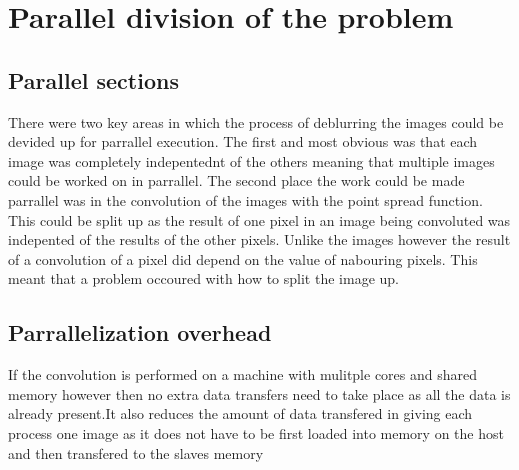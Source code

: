 \section{Parallel division of the problem}

\subsection{Parallel sections}
There were two key areas in which the process of deblurring the images could be devided up for parrallel execution. The first and most obvious was that each image was completely indepentednt of the others meaning that multiple images could be worked on in parrallel. The second place the work could be made parrallel was in the convolution of the images with the point spread function. This could be split up as the result of one pixel in an image being convoluted was indepented of the results of the other pixels. Unlike the images however the result of a convolution of a pixel did depend on the value of nabouring pixels. This meant that a problem occoured with how to split the image up.

\subsection{Parrallelization overhead}

If the convolution is performed on a machine with mulitple cores and shared memory however then no extra data transfers need to take place as all the data is already present.It also reduces the amount of data transfered in giving each process one image as it does not have to be first loaded into memory on the host and then transfered to the slaves memory